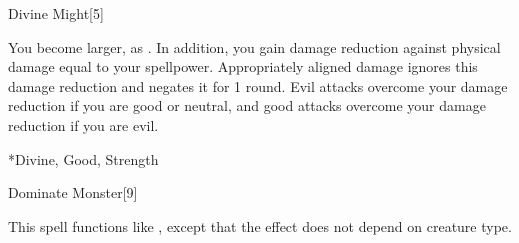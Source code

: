 \begin{spellsection}{Divine Might}[5]
    \begin{spellheader}
    \end{spellheader}
    \begin{spellcontent}
        \begin{spelltargetinginfo}
        \end{spelltargetinginfo}
        \begin{spelleffects}
            \spelleffect You become larger, as . In addition, you gain damage reduction against physical damage equal to your spellpower. Appropriately aligned damage ignores this damage reduction and negates it for 1 round. Evil attacks overcome your damage reduction if you are good or neutral, and good attacks overcome your damage reduction if you are evil.
            \spelldur \durshort \dismissable
        \end{spelleffects}
    \end{spellcontent}
    \begin{spellfooter}
        *{Divine, Good, Strength}
        \spellnotes \sizingspellnotes
        \miscastexplode
    \end{spellfooter}
\end{spellsection}


\begin{spellsection}{Dominate Monster}[9]
    \begin{spellheader}
    \end{spellheader}
    \begin{spellcontent}
        \begin{spelltargetinginfo}
        \end{spelltargetinginfo}
        \begin{spelleffects}
            \spellspecial This spell functions like , except that the effect does not depend on creature type.
        \end{spelleffects}
    \end{spellcontent}
    \begin{spellfooter}
        \miscastrandom
    \end{spellfooter}
\end{spellsection}

